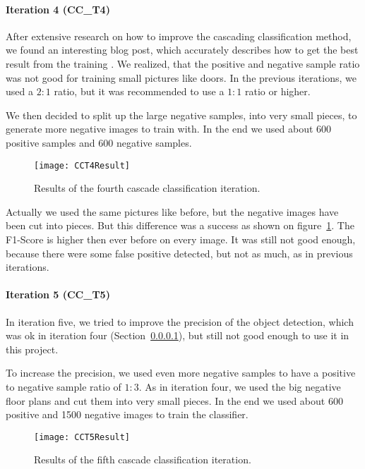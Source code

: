 \paragraph{Iteration 4 (CC\_T4)}
\label{sub:CCT4}

After extensive research on how to improve the cascading classification method, we found an interesting blog post, which accurately describes how to get the best result from the training \citep{ball}. We realized, that the positive and negative sample ratio was not good for training small pictures like doors. In the previous iterations, we used a $2:1$ ratio, but it was recommended to use a $1:1$ ratio or higher.

We then decided to split up the large negative samples, into very small pieces, to generate more negative images to train with. In the end we used about 600 positive samples and 600 negative samples.

\begin{figure}[H]
	\centering
	\texttt{[image: CCT4Result]}
	\caption{Results of the fourth cascade classification iteration.}
	\label{fig:CCT4Result}
\end{figure}

Actually we used the same pictures like before, but the negative images have been cut into pieces. But this difference was a success as shown on figure~\ref{fig:CCT4Result}. The F1-Score is higher then ever before on every image. It was still not good enough, because there were some false positive detected, but not as much, as in previous iterations.

\paragraph{Iteration 5 (CC\_T5)}
\label{sub:CCT5}

In iteration five, we tried to improve the precision of the object detection, which was ok in iteration four (Section~\ref{sub:CCT4}), but still not good enough to use it in this project.

To increase the precision, we used even more negative samples to have a positive to negative sample ratio of $1:3$. As in iteration four, we used the big negative floor plans and cut them into very small pieces. In the end we used about 600 positive and 1500 negative images to train the classifier.

\begin{figure}[H]
	\centering
	\texttt{[image: CCT5Result]}
	\caption{Results of the fifth cascade classification iteration.}
	\label{fig:CCT5Result}
\end{figure}

